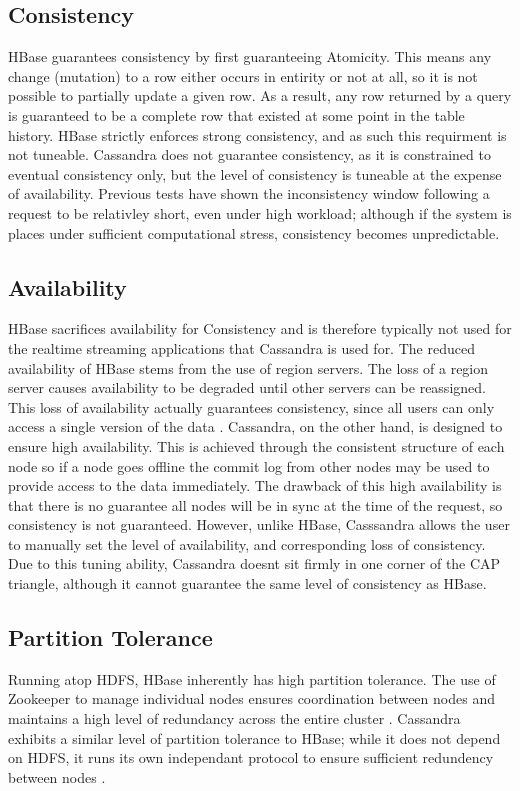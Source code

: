 \documentclass[10pt]{article}
\begin{document}
\subsection{Consistency}
HBase guarantees consistency by first guaranteeing Atomicity. This means any change (mutation) to a row either occurs in entirity or not at all, so it is not possible to partially update a given row. As a result, any row returned by a query is guaranteed to be a complete row that existed at some point in the table history. HBase strictly enforces strong consistency, and as such this requirment is not tuneable. Cassandra does not guarantee consistency, as it is constrained to eventual consistency only, but the level of consistency is tuneable at the expense of availability. Previous tests have shown the inconsistency window following a request to be relativley short, even under high workload; although if the system is places under sufficient computational stress, consistency becomes unpredictable. \cite{10.1007/978-3-319-04936-6_3}

\subsection{Availability}
HBase sacrifices availability for Consistency and is therefore typically not used for the realtime streaming applications that Cassandra is used for. The reduced availability of HBase stems from the use of region servers. The loss of a region server causes availability to be degraded until other servers can be reassigned. This loss of availability actually guarantees consistency, since all users can only access a single version of the data \cite{6885425}. Cassandra, on the other hand, is designed to ensure high availability. This is achieved through the consistent structure of each node so if a node goes offline the commit log from other nodes may be used to provide access to the data immediately. The drawback of this high availability is that there is no guarantee all nodes will be in sync at the time of the request, so consistency is not guaranteed. However, unlike HBase, Casssandra allows the user to manually set the level of availability, and corresponding loss of consistency. Due to this tuning ability, Cassandra doesnt sit firmly in one corner of the CAP triangle, although it cannot guarantee the same level of consistency as HBase.

\subsection{Partition Tolerance}
Running atop HDFS, HBase inherently has high partition tolerance. The use of Zookeeper to manage individual nodes ensures coordination between nodes and maintains a high level of redundancy across the entire cluster \cite{6846507}. Cassandra exhibits a similar level of partition tolerance to HBase; while it does not depend on HDFS, it runs its own independant protocol to ensure sufficient redundency between nodes \cite{DBLP:journals/corr/RahmanTNGV15}.
\end{document}
